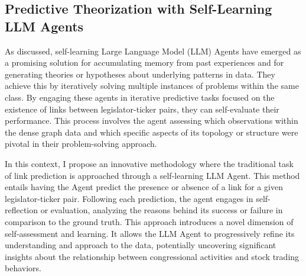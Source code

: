 \documentclass[15pt,letterpaper]{article}
\begin{document}
\subsection{Predictive Theorization with Self-Learning LLM Agents}


As discussed, self-learning Large Language Model (LLM) Agents have emerged as a promising solution for accumulating memory from past experiences and for generating theories or hypotheses about underlying patterns in data. They achieve this by iteratively solving multiple instances of problems within the same class.
By engaging these agents in iterative predictive tasks focused on the existence of links between legislator-ticker pairs, they can self-evaluate their performance. This process involves the agent assessing which observations within the dense graph data and which specific aspects of its topology or structure were pivotal in their problem-solving approach.

In this context, I propose an innovative methodology where the traditional task of link prediction is approached through a self-learning LLM Agent. This method entails having the Agent predict the presence or absence of a link for a given legislator-ticker pair. Following each prediction, the agent engages in self-reflection or evaluation, analyzing the reasons behind its success or failure in comparison to the ground truth.
This approach introduces a novel dimension of self-assessment and learning. It allows the LLM Agent to progressively refine its understanding and approach to the data, potentially uncovering significant insights about the relationship between congressional activities and stock trading behaviors. 
\end{document}
